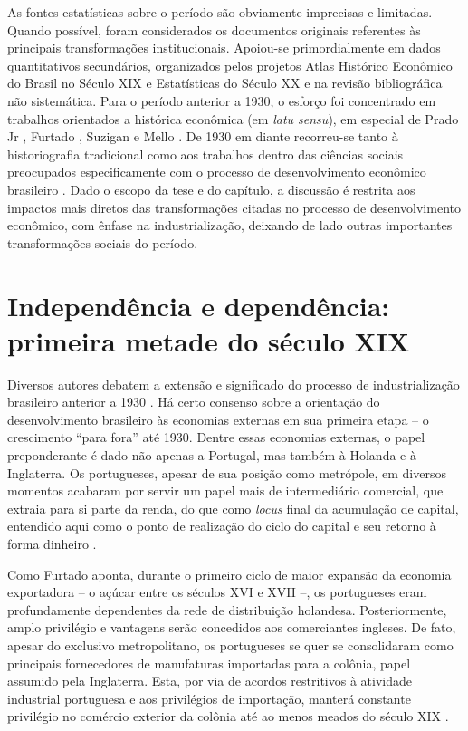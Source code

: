 As fontes estatísticas sobre o período são obviamente imprecisas e
limitadas. Quando possível, foram considerados os documentos originais
referentes às principais transformações institucionais. Apoiou-se
primordialmente em dados quantitativos secundários, organizados pelos
projetos Atlas Histórico Econômico do Brasil no Século XIX
\citep{saraivanabarrogoldfeder_sd} e Estatísticas do Século XX
\citep{estatisticasseculoxx_sd} e
na revisão bibliográfica não sistemática. Para o período anterior a
1930, o esforço foi concentrado em trabalhos orientados a histórica
econômica (em \emph{latu sensu}), em especial de Prado Jr
\citeyearpar{pradojunior_sd,pradojunior2012}, Furtado
\citeyearpar{furtado2005}, Suzigan
\citeyearpar{suzigan2000} e Mello
\citeyearpar{mello1982}. De 1930 em
diante recorreu-se tanto à historiografia tradicional como aos trabalhos
dentro das ciências sociais preocupados especificamente com o processo
de desenvolvimento econômico brasileiro
\citep{hermannetal2015,souzaprevidelli2022,abreu2014}. Dado o escopo da tese e do capítulo, a
discussão é restrita aos impactos mais diretos das transformações
citadas no processo de desenvolvimento econômico, com ênfase na
industrialização, deixando de lado outras importantes transformações
sociais do período.

\section{Independência e dependência: primeira metade do século XIX}\label{independuxeancia-e-dependuxeancia-primeira-metade-do-suxe9culo-xix}

Diversos autores debatem a extensão e significado do processo de
industrialização brasileiro anterior a 1930
\citep{furtado2005,pradojunior2012,suzigan2000}. Há certo consenso sobre a orientação do
desenvolvimento brasileiro às economias externas em sua primeira etapa
-- o crescimento ``para fora''
\citep{mello1982} até
1930. Dentre essas economias externas, o papel preponderante é dado não
apenas a Portugal, mas também à Holanda e à Inglaterra. Os portugueses,
apesar de sua posição como metrópole, em diversos momentos acabaram por
servir um papel mais de intermediário comercial, que extraia para si
parte da renda, do que como \emph{locus} final da acumulação de
capital, entendido aqui como o ponto de realização do ciclo do capital e seu retorno à
forma dinheiro \citep{marx2013}.

Como Furtado \citeyearpar{furtado2005}
aponta, durante o primeiro ciclo de maior expansão da economia
exportadora -- o açúcar entre os séculos XVI e XVII --, os portugueses
eram profundamente dependentes da rede de distribuição holandesa.
Posteriormente, amplo privilégio e vantagens serão concedidos aos
comerciantes ingleses. De fato, apesar do exclusivo metropolitano, os
portugueses se quer se consolidaram como principais fornecedores de
manufaturas importadas para a colônia, papel assumido pela Inglaterra.
Esta, por via de acordos restritivos à atividade industrial portuguesa e
aos privilégios de importação, manterá constante privilégio no comércio
exterior da colônia até ao menos meados do século XIX
\citep{furtado2005}.

